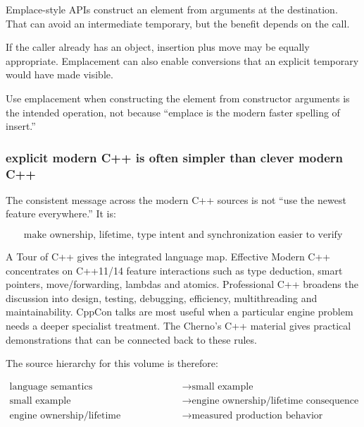 \hypertarget{01-foundations-i-ch005-emplacement-is-not-automatically-faster-or-safer}{}

Emplace-style APIs construct an element from arguments at the destination. That can avoid an intermediate temporary, but the benefit depends on the call.

If the caller already has an object, insertion plus move may be equally appropriate. Emplacement can also enable conversions that an explicit temporary would have made visible.

Use emplacement when constructing the element from constructor arguments is the intended operation, not because ``emplace is the modern faster spelling of insert.''

\subsubsection{explicit modern C++ is often simpler than clever modern C++}\label{01-foundations-i-ch005-explicit-modern-c-is-often-simpler-than-clever-modern-c}

\hypertarget{01-foundations-i-ch005-explicit-modern-c-is-often-simpler-than-clever-modern-c}{}

The consistent message across the modern C++ sources is not ``use the newest feature everywhere.'' It is:

\[
\boxed{
\text{make ownership, lifetime, type intent and synchronization easier to verify}
}
\]

A Tour of C++ gives the integrated language map. Effective Modern C++ concentrates on C++11/14 feature interactions such as type deduction, smart pointers, move/forwarding, lambdas and atomics. Professional C++ broadens the discussion into design, testing, debugging, efficiency, multithreading and maintainability. CppCon talks are most useful when a particular engine problem needs a deeper specialist treatment. The Cherno's C++ material gives practical demonstrations that can be connected back to these rules.

The source hierarchy for this volume is therefore:

\[\begin{aligned}\text{language semantics} &\rightarrow \text{small example}\\\text{small example} &\rightarrow \text{engine ownership/lifetime consequence}\\\text{engine ownership/lifetime consequence} &\rightarrow \text{measured production behavior}\end{aligned}\]

